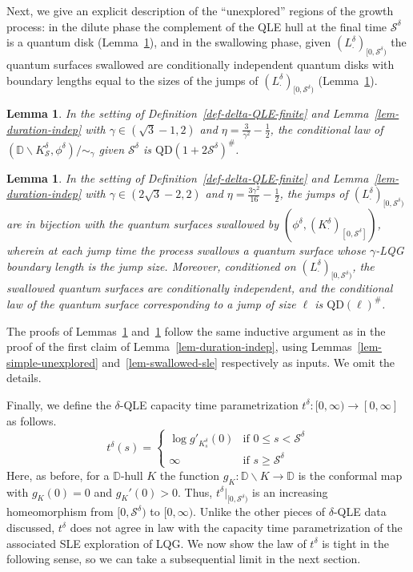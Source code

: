 \documentclass[a4paper]{article}
\numberwithin{equation}{section}
\newcommand{\eqb}{\begin{equation}}
\newcommand{\eqe}{\end{equation}}
\newcommand{\D}{\mathbb{D}}
\newcommand{\qduration}{\mathcal{S}}
\newcommand{\QD}{\mathrm{QD}}
\newtheorem{lemma}[theorem]{Lemma}
\theoremstyle{remark}
\numberwithin{equation}{section}
\begin{document}
Next, we give an explicit description of the ``unexplored'' regions of the growth process: in the dilute phase the complement of the QLE hull at the final time $\qduration^\delta$ is a quantum disk (Lemma~\ref{lem-simple-unexplored-qle}), and in the swallowing phase, given $(L^\delta_\cdot)_{[0,\qduration^\delta)}$ the quantum surfaces swallowed are conditionally independent quantum disks with boundary lengths equal to the sizes of the jumps of $(L^\delta_\cdot)_{[0,\qduration^\delta)}$ (Lemma~\ref{lem-swallowed-delta-qle}). 

\begin{lemma}\label{lem-simple-unexplored-qle}
In the setting of Definition~\ref{def-delta-QLE-finite} and Lemma~\ref{lem-duration-indep}  with $\gamma \in (\sqrt3 - 1, 2)$ and $\eta = \frac{3}{\gamma^2} - \frac12$, the conditional law of $(\D \backslash  K^\delta_\qduration, \phi^\delta)/{\sim_\gamma}$ given $\qduration^\delta$ is $\QD(1 + 2 \qduration^\delta)^\#$.
\end{lemma}

\begin{lemma}\label{lem-swallowed-delta-qle}
In the setting of Definition~\ref{def-delta-QLE-finite} and Lemma~\ref{lem-duration-indep}  with $\gamma \in (2\sqrt3 - 2, 2)$ and $\eta = \frac{3\gamma^2}{16} - \frac12$, the jumps of $(L^\delta_\cdot)_{[0,\qduration^\delta)}$ are in bijection with the quantum surfaces swallowed by $(\phi^\delta, (K^\delta_\cdot)_{[0,\qduration^\delta]})$, wherein at each jump time the process swallows a quantum surface whose $\gamma$-LQG boundary length is the jump size. Moreover, conditioned on $(L^\delta_{\cdot})_{[0,\qduration^\delta)}$, the swallowed quantum surfaces are conditionally independent, and the conditional law of the quantum surface corresponding to a jump of size $\ell$ is $\QD(\ell)^\#$.
\end{lemma}


The proofs of Lemmas~\ref{lem-simple-unexplored-qle} and~\ref{lem-swallowed-delta-qle} follow the same inductive argument as in the proof of the first claim of Lemma~\ref{lem-duration-indep}, using Lemmas~\ref{lem-simple-unexplored} and~\ref{lem-swallowed-sle} respectively as inputs. We omit the details. 



Finally, we define the $\delta$-QLE capacity time parametrization  $t^\delta: [0,\infty) \to [0,\infty]$ as follows. 
\eqb \label{eq-t-delta}
t^\delta(s) = 
\left\{
	\begin{array}{ll}
		\log g'_{K_s^\delta}(0)  & \mbox{if } 0 \leq s < \qduration^\delta  \\
	   \infty & \mbox{if } s \geq \qduration^\delta
	\end{array}
\right.
\eqe
Here, as before, for a $\D$-hull $K$ the function $g_K: \D \backslash K \to \D$ is the conformal map with $g_K(0) = 0$ and $g_K'(0) > 0$.
Thus, $t^\delta|_{[0,\qduration^\delta)}$ is an increasing homeomorphism from $[0,\qduration^\delta)$ to $[0,\infty)$.  Unlike the other pieces of $\delta$-QLE data discussed, $t^\delta$ does not agree in law with the capacity time parametrization of the associated SLE exploration of LQG. We now show the law of $t^\delta$ is tight in the following sense, so we can take a subsequential limit in the next section.  
\end{document}
